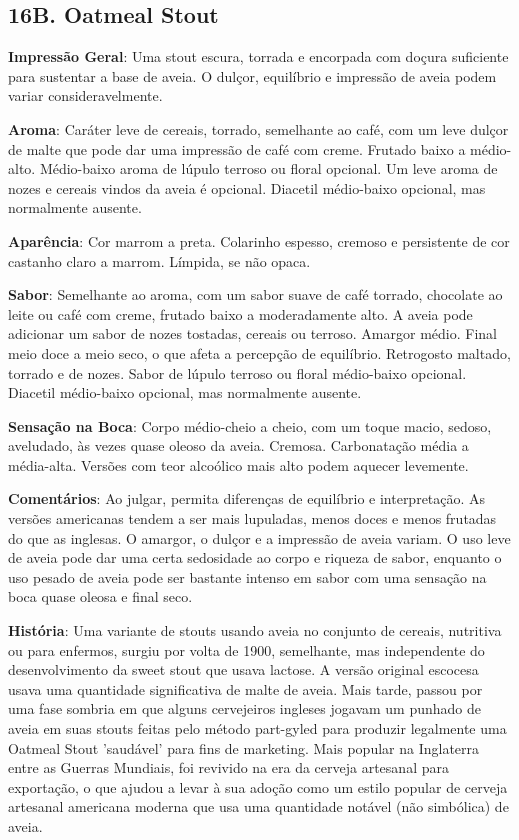 \subsection*{16B. Oatmeal Stout}
\textbf{Impressão Geral}: Uma stout escura, torrada e encorpada com doçura suficiente para sustentar a base de aveia. O dulçor, equilíbrio e impressão de aveia podem variar consideravelmente.

\textbf{Aroma}: Caráter leve de cereais, torrado, semelhante ao café, com um leve dulçor de malte que pode dar uma impressão de café com creme. Frutado baixo a médio-alto. Médio-baixo aroma de lúpulo terroso ou floral opcional. Um leve aroma de nozes e cereais vindos da aveia é opcional. Diacetil médio-baixo opcional, mas normalmente ausente.

\textbf{Aparência}: Cor marrom a preta. Colarinho espesso, cremoso e persistente de cor castanho claro a marrom. Límpida, se não opaca.

\textbf{Sabor}: Semelhante ao aroma, com um sabor suave de café torrado, chocolate ao leite ou café com creme, frutado baixo a moderadamente alto. A aveia pode adicionar um sabor de nozes tostadas, cereais ou terroso. Amargor médio. Final meio doce a meio seco, o que afeta a percepção de equilíbrio. Retrogosto maltado, torrado e de nozes. Sabor de lúpulo terroso ou floral médio-baixo opcional. Diacetil médio-baixo opcional, mas normalmente ausente.

\textbf{Sensação na Boca}: Corpo médio-cheio a cheio, com um toque macio, sedoso, aveludado, às vezes quase oleoso da aveia. Cremosa. Carbonatação média a média-alta. Versões com teor alcoólico mais alto podem aquecer levemente.

\textbf{Comentários}: Ao julgar, permita diferenças de equilíbrio e interpretação. As versões americanas tendem a ser mais lupuladas, menos doces e menos frutadas do que as inglesas. O amargor, o dulçor e a impressão de aveia variam. O uso leve de aveia pode dar uma certa sedosidade ao corpo e riqueza de sabor, enquanto o uso pesado de aveia pode ser bastante intenso em sabor com uma sensação na boca quase oleosa e final seco.

\textbf{História}: Uma variante de stouts usando aveia no conjunto de cereais, nutritiva ou para enfermos, surgiu por volta de 1900, semelhante, mas independente do desenvolvimento da sweet stout que usava lactose. A versão original escocesa usava uma quantidade significativa de malte de aveia. Mais tarde, passou por uma fase sombria em que alguns cervejeiros ingleses jogavam um punhado de aveia em suas stouts feitas pelo método part-gyled para produzir legalmente uma Oatmeal Stout 'saudável' para fins de marketing. Mais popular na Inglaterra entre as Guerras Mundiais, foi revivido na era da cerveja artesanal para exportação, o que ajudou a levar à sua adoção como um estilo popular de cerveja artesanal americana moderna que usa uma quantidade notável (não simbólica) de aveia.

